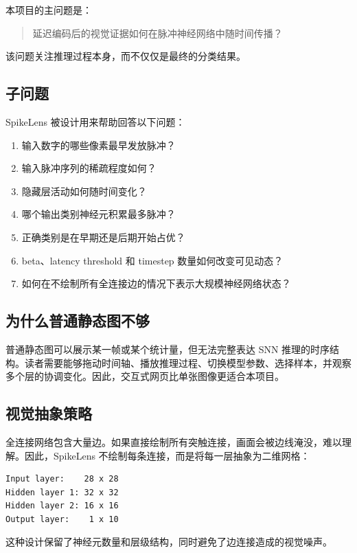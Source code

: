 \documentclass[UTF8,11pt,a4paper]{ctexart}
\newcommand{\projecttitle}{SpikeLens}
\begin{document}
本项目的主问题是：

\begin{quote}
延迟编码后的视觉证据如何在脉冲神经网络中随时间传播？
\end{quote}

该问题关注推理过程本身，而不仅仅是最终的分类结果。

\subsection{子问题}

\projecttitle{} 被设计用来帮助回答以下问题：

\begin{enumerate}
    \item 输入数字的哪些像素最早发放脉冲？
    \item 输入脉冲序列的稀疏程度如何？
    \item 隐藏层活动如何随时间变化？
    \item 哪个输出类别神经元积累最多脉冲？
    \item 正确类别是在早期还是后期开始占优？
    \item beta、latency threshold 和 timestep 数量如何改变可见动态？
    \item 如何在不绘制所有全连接边的情况下表示大规模神经网络状态？
\end{enumerate}

\subsection{为什么普通静态图不够}

普通静态图可以展示某一帧或某个统计量，但无法完整表达 SNN 推理的时序结构。读者需要能够拖动时间轴、播放推理过程、切换模型参数、选择样本，并观察多个层的协调变化。因此，交互式网页比单张图像更适合本项目。

\subsection{视觉抽象策略}

全连接网络包含大量边。如果直接绘制所有突触连接，画面会被边线淹没，难以理解。因此，\projecttitle{} 不绘制每条连接，而是将每一层抽象为二维网格：

\begin{lstlisting}
Input layer:    28 x 28
Hidden layer 1: 32 x 32
Hidden layer 2: 16 x 16
Output layer:    1 x 10
\end{lstlisting}

这种设计保留了神经元数量和层级结构，同时避免了边连接造成的视觉噪声。
\end{document}
